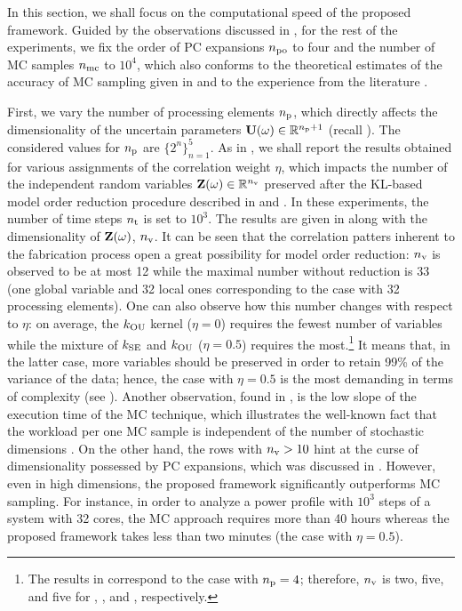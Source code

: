 In this section, we shall focus on the computational speed of the proposed framework.
Guided by the observations discussed in , for the rest of the experiments, we fix the order of PC expansions ${n_\text{po}}$ to four and the number of MC samples ${n_\text{mc}}$ to $10^4$, which also conforms to the theoretical estimates of the accuracy of MC sampling given in \cite{diaz-emparanza2002} and to the experience from the literature \cite{xiu2010, maitre2010, shen2009, eldred2008}.

First, we vary the number of processing elements ${n_\text{p}}$, which directly affects the dimensionality of the uncertain parameters $\mathbf{U}(\omega) \in \mathbb{R}^{{n_\text{p}} + 1}$ (recall ).
The considered values for ${n_\text{p}}$ are $\{ 2^n \}_{n = 1}^5$.
As in , we shall report the results obtained for various assignments of the correlation weight $\eta$, which impacts the number of the independent random variables $\mathbf{Z}(\omega) \in \mathbb{R}^{n_\text{v}}$ preserved after the KL-based model order reduction procedure described in  and .
In these experiments, the number of time steps ${n_\text{t}}$ is set to $10^3$.
The results are given in  along with the dimensionality of $\mathbf{Z}(\omega)$, ${n_\text{v}}$.
It can be seen that the correlation patters inherent to the fabrication process \cite{cheng2011} open a great possibility for model order reduction: ${n_\text{v}}$ is observed to be at most 12 while the maximal number without reduction is 33 (one global variable and 32 local ones corresponding to the case with 32 processing elements).
One can also observe how this number changes with respect to $\eta$: on average, the $\fCorr_\OU$ kernel ($\eta = 0$) requires the fewest number of variables while the mixture of $\fCorr_\SE$ and $\fCorr_\OU$ ($\eta = 0.5$) requires the most.\footnote{The results in  correspond to the case with ${n_\text{p}} = 4$; therefore, ${n_\text{v}}$ is two, five, and five for , , and , respectively.}
It means that, in the latter case, more variables should be preserved in order to retain 99\% of the variance of the data; hence, the case with $\eta = 0.5$ is the most demanding in terms of complexity (see ).
Another observation, found in , is the low slope of the execution time of the MC technique, which illustrates the well-known fact that the workload per one MC sample is independent of the number of stochastic dimensions \cite{maitre2010}.
On the other hand, the rows with ${n_\text{v}} > 10$ hint at the curse of dimensionality possessed by PC expansions, which was discussed in .
However, even in high dimensions, the proposed framework significantly outperforms MC sampling. For instance, in order to analyze a power profile with $10^3$ steps of a system with 32 cores, the MC approach requires more than 40 hours whereas the proposed framework takes less than two minutes (the case with $\eta = 0.5$).

